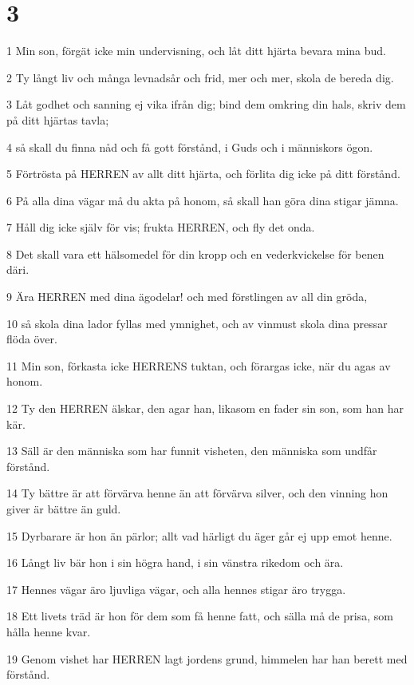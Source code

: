 \chapter{3}

\par 1 Min son, förgät icke min undervisning, och låt ditt hjärta bevara mina bud.
\par 2 Ty långt liv och många levnadsår och frid, mer och mer, skola de bereda dig.
\par 3 Låt godhet och sanning ej vika ifrån dig; bind dem omkring din hals, skriv dem på ditt hjärtas tavla;
\par 4 så skall du finna nåd och få gott förstånd, i Guds och i människors ögon.
\par 5 Förtrösta på HERREN av allt ditt hjärta, och förlita dig icke på ditt förstånd.
\par 6 På alla dina vägar må du akta på honom, så skall han göra dina stigar jämna.
\par 7 Håll dig icke själv för vis; frukta HERREN, och fly det onda.
\par 8 Det skall vara ett hälsomedel för din kropp och en vederkvickelse för benen däri.
\par 9 Ära HERREN med dina ägodelar! och med förstlingen av all din gröda,
\par 10 så skola dina lador fyllas med ymnighet, och av vinmust skola dina pressar flöda över.
\par 11 Min son, förkasta icke HERRENS tuktan, och förargas icke, när du agas av honom.
\par 12 Ty den HERREN älskar, den agar han, likasom en fader sin son, som han har kär.
\par 13 Säll är den människa som har funnit visheten, den människa som undfår förstånd.
\par 14 Ty bättre är att förvärva henne än att förvärva silver, och den vinning hon giver är bättre än guld.
\par 15 Dyrbarare är hon än pärlor; allt vad härligt du äger går ej upp emot henne.
\par 16 Långt liv bär hon i sin högra hand, i sin vänstra rikedom och ära.
\par 17 Hennes vägar äro ljuvliga vägar, och alla hennes stigar äro trygga.
\par 18 Ett livets träd är hon för dem som få henne fatt, och sälla må de prisa, som hålla henne kvar.
\par 19 Genom vishet har HERREN lagt jordens grund, himmelen har han berett med förstånd.
